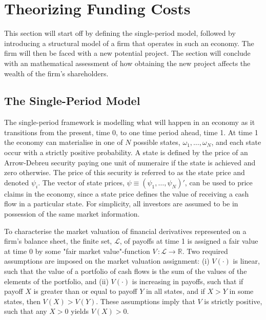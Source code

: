 \documentclass[main.tex]{subfiles}
\begin{document}
    \section{Theorizing Funding Costs}
    \label{sec:single-period-model}
        This section will start off by defining the single-period model,
        followed by introducing a structural model of a firm that operates in such an economy.
        The firm will then be faced with a new potential project.
        The section will conclude with an mathematical assessment of 
        how obtaining the new project affects the wealth of the firm's shareholders.

    \subsection{The Single-Period Model}
        The single-period framework is modelling what will happen in an economy as it transitions from the present, time 0, to one time period ahead, time 1.
        At time 1 the economy can materialise in one of $N$ possible states, $\omega_{1}, \dots, \omega_{N}$, and each state occur with a strictly positive probability.
        A state is defined by the price of an Arrow-Debreu security paying one unit of numeraire if the state is achieved and zero otherwise.
        The price of this security is referred to as the state price and denoted $\psi_{i}$.
        The vector of state prices, $\psi \equiv \left(\psi_{1}, \dots, \psi_{N}\right)'$, can be used to price claims in the economy, since a state price defines the value of receiving a cash flow in a particular state.
        For simplicity, all investors are assumed to be in possession of the same market information.

        To characterise the market valuation of financial derivatives represented on a firm's balance sheet, the finite set, $\mathcal{L}$, of payoffs at time 1 is assigned a fair value at time 0 by some "fair market value"-function $V\, \colon \mathcal{L} \rightarrow \mathbb{R}$.
        Two required assumptions are imposed on the market valuation assignment: 
        (i) $V(\cdot)$ is linear, such that the value of a portfolio of cash flows is the sum of the values of the elements of the portfolio, and 
        (ii) $V(\cdot)$ is increasing in payoffs, such that if payoff $X$ is greater than or equal to payoff $Y$ in all states, and if $X>Y$ in some states, then $V(X)>V(Y)$.
        These assumptions imply that $V$ is strictly positive, such that any $X>0$ yields $V(X) > 0$.
        
\end{document}
